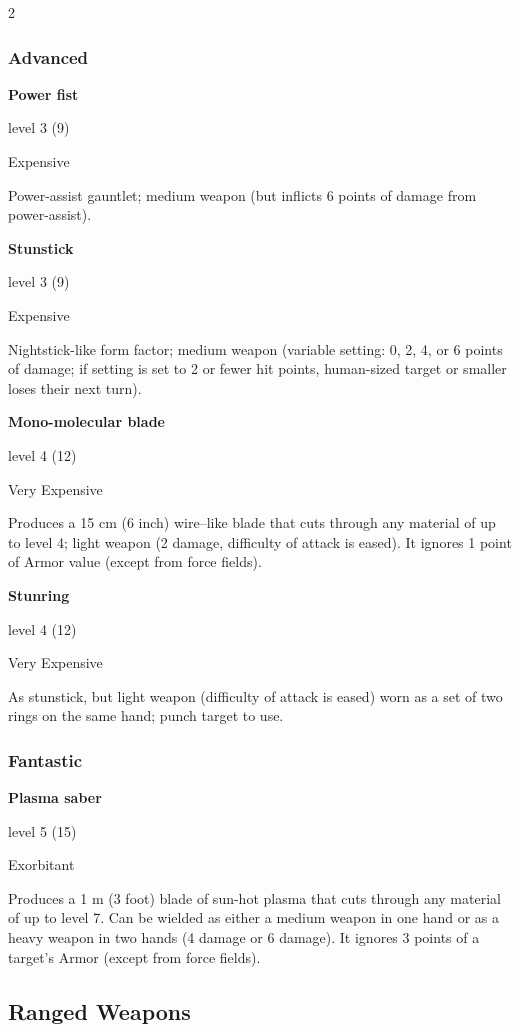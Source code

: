 \begin{multicols}{2}
\subsubsection{Advanced}

\textbf{Power fist} 

level 3 (9) 

Expensive 

Power-assist gauntlet; medium weapon (but inflicts 6 points of damage from power-assist). 

\textbf{Stunstick} 

level 3 (9) 

Expensive 

Nightstick-like form factor; medium weapon (variable setting: 0, 2, 4, or 6 points of damage; if setting is set to 2 or fewer hit points, human-sized target or smaller loses their next turn). 

\textbf{Mono-molecular blade} 

level 4 (12) 

Very Expensive 

Produces a 15 cm (6 inch) wire–like blade that cuts through any material of up to level 4; light weapon (2 damage, difficulty of attack is eased). It ignores 1 point of Armor value (except from force fields). 

\textbf{Stunring} 

level 4 (12) 

Very Expensive 

As stunstick, but light weapon (difficulty of attack is eased) worn as a set of two rings on the same hand; punch target to use.

\subsubsection{Fantastic}

\textbf{Plasma saber} 

level 5 (15) 

Exorbitant 

Produces a 1 m (3 foot) blade of sun-hot plasma that cuts through any material of up to level 7. Can be wielded as either a medium weapon in one hand or as a heavy weapon in two hands (4 damage or 6 damage). It ignores 3 points of a target’s Armor (except from force fields).

\subsection{Ranged Weapons}


\end{multicols}

